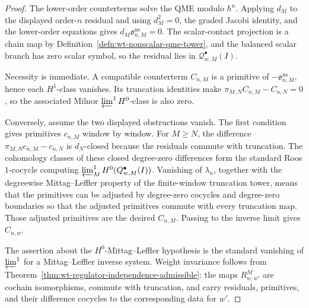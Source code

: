 \begin{proof}
  The lower-order counterterms solve the QME modulo \(\hbar^n\).  Applying
  \(d_M\) to the displayed order-\(n\) residual and using
  \(d_M^2=0\), the graded Jacobi identity, and the lower-order equations
  gives \(d_M\mathfrak o^{\mathrm{ns}}_{n,M}=0\).  The scalar-contact
  projection is a chain map by
  Definition~\ref{defn:wt-nonscalar-qme-tower}, and the balanced scalar
  branch has zero scalar symbol, so the residual lies in
  \(\mathcal Q^\bullet_{w,M}(I)\).

  Necessity is immediate.  A compatible counterterm \(C_{n,M}\) is a
  primitive of \(-\mathfrak o^{\mathrm{ns}}_{n,M}\), hence each
  \(H^1\)-class vanishes.  Its truncation identities make
  \(\pi_{M,N}C_{n,M}-C_{n,N}=0\), so the associated Milnor
  \(\varprojlim^1 H^0\)-class is also zero.

  Conversely, assume the two displayed obstructions vanish.  The first
  condition gives primitives \(c_{n,M}\) window by window.  For
  \(M\geq N\), the difference
  \(\pi_{M,N}c_{n,M}-c_{n,N}\) is \(d_N\)-closed because the residuals
  commute with truncation.  The cohomology classes of these closed
  degree-zero differences form the standard Roos \(1\)-cocycle computing
  \(\varprojlim^1_MH^0(\mathcal Q^\bullet_{w,M}(I))\).  Vanishing of
  \(\lambda_n\), together with the degreewise Mittag--Leffler property of
  the finite-window truncation tower, means that the primitives can be
  adjusted by degree-zero cocycles and degree-zero boundaries so that the
  adjusted primitives commute with every truncation map.  Those adjusted
  primitives are the desired \(C_{n,M}\).  Passing to the inverse limit
  gives \(C_{n,w}\).

  The assertion about the \(H^0\)-Mittag--Leffler hypothesis is the
  standard vanishing of \(\varprojlim^1\) for a Mittag--Leffler inverse
  system.  Weight invariance follows from
  Theorem~\ref{thm:wt-regulator-independence-admissible}: the maps
  \(R^M_{w,w'}\) are cochain isomorphisms, commute with truncation, and
  carry residuals, primitives, and their difference cocycles to the
  corresponding data for \(w'\).
\end{proof}

